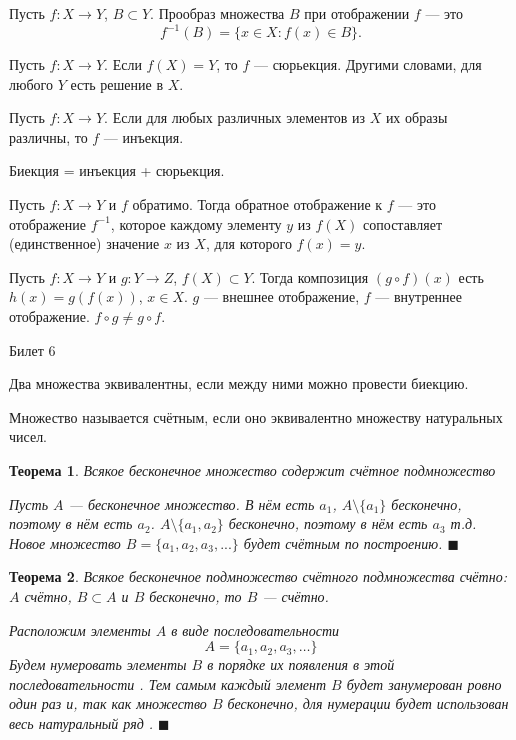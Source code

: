 \documentclass[12pt,a4paper]{article}
\newtheorem*{theorem*}{Теорема}
\begin{document}
Пусть $f: X \rightarrow Y$, $B \subset Y$. Прообраз множества $B$ при отображении $f$ --- это $$f^{-1}(B)=\{x \in X: f(x) \in B\} .$$

Пусть $f: X \rightarrow Y$. Если $f(X) = Y$, то $f$ --- сюрьекция. Другими словами, для любого $Y$ есть решение в $X$.

Пусть $f: X \rightarrow Y$. Если для любых различных элементов из $X$ их образы различны, то $f$ --- инъекция.

Биекция = инъекция + сюрьекция.

Пусть $f: X \rightarrow Y$ и $f$ обратимо. Тогда обратное отображение к $f$ --- это отображение $f^{-1}$, которое каждому элементу $y$ из $f(X)$ сопоставляет (единственное) значение $x$ из $X$, для которого $f(x)=y$.

Пусть $f: X \rightarrow Y$ и $g: Y \rightarrow Z$, $f(X) \subset Y$. Тогда композиция $(g \circ f)(x)$ есть $h(x) = g(f(x))$, $x \in X$. $g$ --- внешнее отображение, $f$ --- внутреннее отображение. $f \circ g \ne g \circ f$.

\begin{center}
Билет 6
\end{center}

Два множества эквивалентны, если между ними можно провести биекцию.

Множество называется счётным, если оно эквивалентно множеству натуральных чисел.

\begin{theorem*}
\label{6.1}
Всякое бесконечное множество содержит счётное подмножество

Пусть $A$ --- бесконечное множество. В нём есть $a_1$, $A \setminus \{a_1\}$ бесконечно, поэтому в нём есть $a_2$. $A \setminus \{a_1, a_2\}$ бесконечно, поэтому в нём есть $a_3$  т.д. Новое множество $B = \{a_1, a_2, a_3, ...\}$ будет счётным по построению. $\blacksquare$
\end{theorem*}

\begin{theorem*}
\label{6.2}
Всякое бесконечное подмножество счётного подмножества счётно: $A$ счётно, $B \subset A$ и $B$ бесконечно, то $B$ --- счётно.

Расположим элементы $A$ в виде последовательности
$$
A = \{ a_1, a_2, a_3, \ldots \}
$$
Будем нумеровать элементы $B$ в порядке их появления в этой последовательности . Тем самым каждый элемент $B$ будет занумерован ровно один раз и, так как множество $B$ бесконечно, для нумерации будет использован весь натуральный ряд . $\blacksquare$
\end{theorem*}
\end{document}

